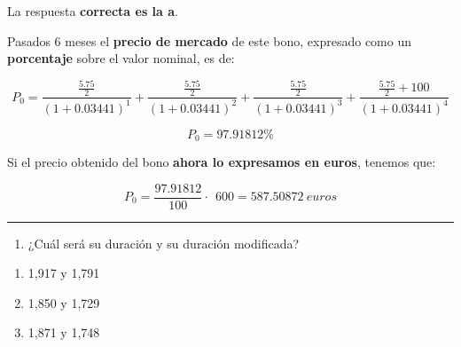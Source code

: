 \documentclass[
  letterpaper,
  DIV=11,
  numbers=noendperiod]{scrartcl}
\providecommand{\tightlist}{%
  \setlength{\itemsep}{0pt}\setlength{\parskip}{0pt}}\usepackage{longtable,booktabs,array}
\begin{document}
\begin{tcolorbox}[enhanced jigsaw, colframe=quarto-callout-tip-color-frame, opacityback=0, opacitybacktitle=0.6, colback=white, leftrule=.75mm, bottomtitle=1mm, colbacktitle=quarto-callout-tip-color!10!white, coltitle=black, toprule=.15mm, left=2mm, breakable, toptitle=1mm, titlerule=0mm, title=\textcolor{quarto-callout-tip-color}{\faLightbulb}\hspace{0.5em}{Solución}, arc=.35mm, rightrule=.15mm, bottomrule=.15mm]

La respuesta \textbf{correcta es la a}.

Pasados 6 meses el \textbf{precio de mercado} de este bono, expresado
como un \textbf{porcentaje} sobre el valor nominal, es de:

\[P_0=\frac{\frac{5.75}{2}}{\left(1+0.03441\right)^1}+\frac{\frac{5.75}{2}}{\left(1+0.03441\right)^2}+\frac{\frac{5.75}{2}}{\left(1+0.03441\right)^3}+\frac{\frac{5.75}{2}+100}{\left(1+0.03441\right)^4}\]

\[P_0=97.91812\% \]

Si el precio obtenido del bono \textbf{ahora lo expresamos en euros},
tenemos que:

\[P_0=\frac{97.91812}{100}\cdot \:\:600=587.50872\ euros\]

\end{tcolorbox}

\begin{center}\rule{0.5\linewidth}{0.5pt}\end{center}

\begin{enumerate}
\def\labelenumi{\arabic{enumi}.}
\setcounter{enumi}{1}
\tightlist
\item
  ¿Cuál será su duración y su duración modificada?
\end{enumerate}

\begin{enumerate}
\def\labelenumi{\alph{enumi}.}
\item
  1,917 y 1,791
\item
  1,850 y 1,729
\item
  1,871 y 1,748
\end{enumerate}
\end{document}
